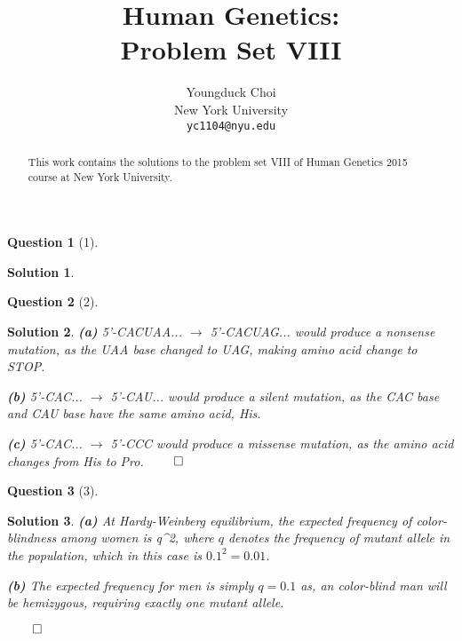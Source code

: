 \documentclass{article} %
\title{Human Genetics: \\
Problem Set VIII}
\author{
Youngduck Choi \\
New York University\\
\texttt{yc1104@nyu.edu} \\
}
\theoremstyle{quest}
\newtheorem*{question}{Question}
\newtheorem*{solution}{Solution}
\begin{document}
\maketitle

\begin{abstract}
This work contains the solutions to the problem set VIII
of Human Genetics 2015 course at New York University.
\end{abstract}

\bigskip

\begin{question}[1]
\end{question}
\begin{solution}
\end{solution}

\bigskip

\begin{question}[2]
\end{question}
\begin{solution}
\textbf{(a)} 5'-CACUAA... $\to$ 5'-CACUAG... would produce a nonsense
mutation, as the UAA base changed to UAG, making amino acid change to STOP.

\smallskip

\textbf{(b)} 5'-CAC... $\to$ 5'-CAU... would produce a silent mutation,
as the CAC base and CAU base have the same amino acid, His. 

\smallskip

\textbf{(c)} 5'-CAC... $\to$ 5'-CCC would produce a missense mutation,
as the amino acid changes from His to Pro.
\hfill $\qed$

\end{solution}

\bigskip

\begin{question}[3]
\end{question}
\begin{solution}
\textbf{(a)} At Hardy-Weinberg equilibrium, the expected frequency 
of color-blindness among women is q^2, where $q$ denotes the frequency
of mutant allele in the population, which in this case is $0.1^2 = 0.01$.

\smallskip

\textbf{(b)} The expected frequency for men is simply $q = 0.1$ as, 
an color-blind man will be hemizygous, requiring exactly one mutant allele.

\hfill $\qed$

 
\end{solution}


\bigskip
\end{document}
